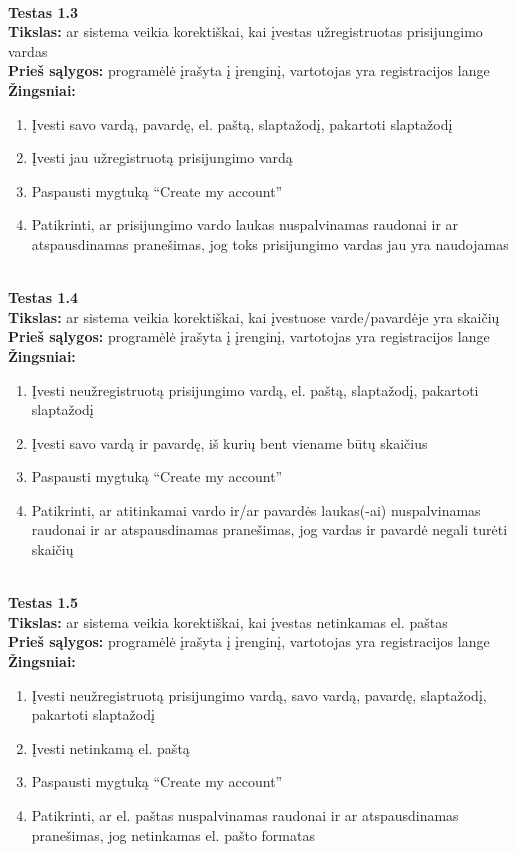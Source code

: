 \documentclass{VUMIFPSkursinis}
\begin{document}
		\textbf{}\\
		\textbf{Testas 1.3}\\
		\textbf{Tikslas:} ar sistema veikia korektiškai, kai įvestas užregistruotas prisijungimo vardas\\
		\textbf{Prieš sąlygos:} programėlė įrašyta į įrenginį, vartotojas yra registracijos lange\\
		\textbf{Žingsniai:}
		\begin{enumerate}[noitemsep,topsep=0pt]
			\item Įvesti savo vardą, pavardę, el. paštą, slaptažodį, pakartoti slaptažodį
			\item Įvesti jau užregistruotą prisijungimo vardą
			\item Paspausti mygtuką “Create my account” 
			\item Patikrinti, ar prisijungimo vardo laukas nuspalvinamas raudonai ir ar atspausdinamas pranešimas, jog toks prisijungimo vardas jau yra naudojamas
		\end{enumerate}
		\textbf{}\\
		\textbf{Testas 1.4}\\
		\textbf{Tikslas:} ar sistema veikia korektiškai, kai įvestuose varde/pavardėje yra skaičių\\
		\textbf{Prieš sąlygos:} programėlė įrašyta į įrenginį, vartotojas yra registracijos lange\\
		\textbf{Žingsniai:}
		\begin{enumerate}[noitemsep,topsep=0pt]
			\item Įvesti neužregistruotą prisijungimo vardą, el. paštą, slaptažodį, pakartoti slaptažodį
			\item Įvesti savo vardą ir pavardę, iš kurių bent viename būtų skaičius
			\item Paspausti mygtuką “Create my account” 
			\item Patikrinti, ar atitinkamai vardo ir/ar pavardės laukas(-ai) nuspalvinamas raudonai ir ar atspausdinamas pranešimas, jog vardas ir pavardė negali turėti skaičių
		\end{enumerate}
		\textbf{}\\
		\textbf{Testas 1.5}\\
		\textbf{Tikslas:} ar sistema veikia korektiškai, kai įvestas netinkamas el. paštas\\
		\textbf{Prieš sąlygos:} programėlė įrašyta į įrenginį, vartotojas yra registracijos lange\\
		\textbf{Žingsniai:}
		\begin{enumerate}[noitemsep,topsep=0pt]
			\item Įvesti neužregistruotą prisijungimo vardą, savo vardą, pavardę, slaptažodį, pakartoti slaptažodį
			\item Įvesti netinkamą el. paštą
			\item Paspausti mygtuką “Create my account” 
			\item Patikrinti, ar el. paštas nuspalvinamas raudonai ir ar atspausdinamas pranešimas, jog netinkamas el. pašto formatas
		\end{enumerate}
\end{document}
